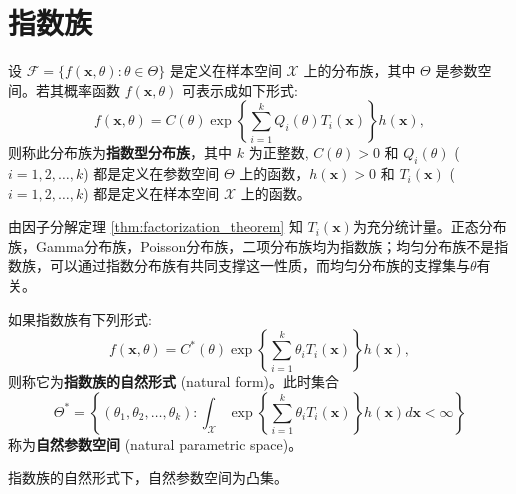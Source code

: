 \section{指数族}\label{sec:指数族}
\begin{definition}[指数族] \label{def:exponential_family}
设 $\mathcal{F} = \{f(\boldsymbol{x}, \theta): \theta \in \Theta\}$ 是定义在样本空间 $\mathcal{X}$ 上的分布族，其中 $\Theta$ 是参数空间。若其概率函数 $f(\boldsymbol{x}, \theta)$ 可表示成如下形式:
\begin{equation} \label{eq:exponential_family_form}
f(\boldsymbol{x}, \theta) = C(\theta) \exp\left\{\sum_{i=1}^k Q_i(\theta)T_i(\boldsymbol{x})\right\} h(\boldsymbol{x}),
\end{equation}
则称此分布族为\textbf{指数型分布族}，其中 $k$ 为正整数, $C(\theta)>0$ 和 $Q_i(\theta)$ ($i=1,2,\ldots,k$) 都是定义在参数空间 $\Theta$ 上的函数，$h(\boldsymbol{x})>0$ 和 $T_i(\boldsymbol{x})$ ($i=1,2,\ldots,k$) 都是定义在样本空间 $\mathcal{X}$ 上的函数。
\end{definition}
\begin{remark}
    由因子分解定理 \ref{thm:factorization_theorem} 知 $T_i(\boldsymbol{x})$为充分统计量。正态分布族，Gamma分布族，Poisson分布族，二项分布族均为指数族；均匀分布族不是指数族，可以通过指数分布族有共同支撑这一性质，而均匀分布族的支撑集与$\theta$有关。
\end{remark}

\begin{definition}[指数族的自然形式] \label{def:natural_form_exponential_family}
如果指数族有下列形式:
\begin{equation} \label{eq:natural_form_exponential_family}
f(\boldsymbol{x}, \theta) = C^*(\theta) \exp\left\{\sum_{i=1}^k \theta_i T_i(\boldsymbol{x})\right\} h(\boldsymbol{x}),
\end{equation}
则称它为\textbf{指数族的自然形式} (natural form)。此时集合
\begin{equation} \label{eq:natural_parametric_space}
\Theta^* = \left\{(\theta_1, \theta_2, \ldots, \theta_k): \int_{\mathcal{X}} \exp\left\{\sum_{i=1}^k \theta_i T_i(\boldsymbol{x})\right\} h(\boldsymbol{x})d\boldsymbol{x} < \infty \right\}
\end{equation}
称为\textbf{自然参数空间} (natural parametric space)。
\end{definition}
\begin{remark}
    指数族的自然形式下，自然参数空间为凸集。
\end{remark}

